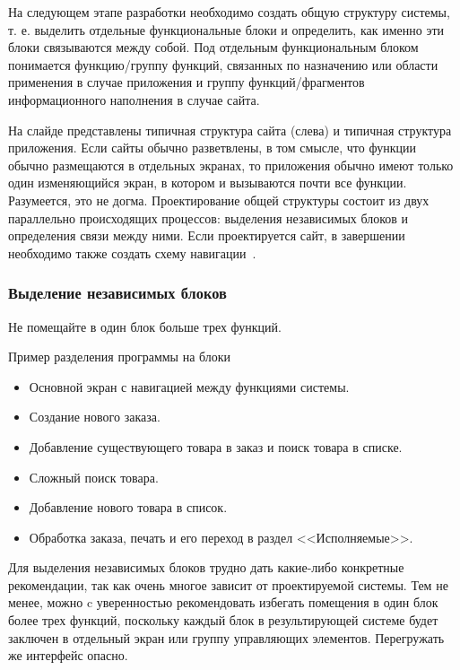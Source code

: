 \documentclass{../industrial-development}
\begin{document}
\lecturenotes

На следующем этапе разработки необходимо создать общую структуру системы, т. е. выделить отдельные функциональные блоки и определить, как именно эти блоки связываются между собой. Под отдельным функциональным блоком понимается функцию/группу функций, связанных по назначению или области применения в случае приложения и группу функций/фрагментов информационного наполнения в случае сайта.

На слайде представлены типичная структура сайта (слева) и типичная структура приложения. Если сайты обычно разветвлены, в том смысле, что функции обычно размещаются в отдельных экранах, то приложения обычно имеют только один изменяющийся экран, в котором и вызываются почти все функции. Разумеется, это не догма. Проектирование общей структуры состоит из двух параллельно происходящих процессов: выделения независимых блоков и определения связи между ними. Если проектируется сайт, в завершении необходимо также создать схему навигации~\cite[с.~117]{Golovach}.

\begin{frame} \frametitle{Выделение независимых блоков}
 \begin{block}{}
  Не помещайте в один блок больше трех функций.
 \end{block}

 \begin{block}{Пример разделения программы на блоки}
  \begin{itemize}
   \item Основной экран с навигацией между функциями системы.
   \item Создание нового заказа.
   \item Добавление существующего товара в заказ и поиск товара в списке.
   \item Сложный поиск товара.
   \item Добавление нового товара в список.
   \item Обработка заказа, печать и его переход в раздел <<Исполняемые>>.
  \end{itemize}
 \end{block}
\end{frame}

\lecturenotes

Для выделения независимых блоков трудно дать какие-либо конкретные рекомендации, так как очень многое зависит от проектируемой системы. Тем не менее, можно c уверенностью рекомендовать избегать помещения в один блок более трех функций, поскольку каждый блок в результирующей системе будет заключен в отдельный экран или группу управляющих элементов. Перегружать же интерфейс опасно.
\end{document}
